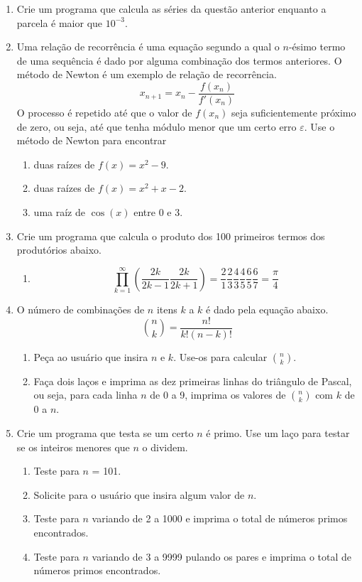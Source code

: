 \begin{enumerate}
  \item Crie um programa que calcula as séries da questão anterior enquanto a parcela é maior que $10^{-3}$.

  \item Uma relação de recorrência é uma equação segundo a qual o $n$-ésimo termo de uma sequência é dado por alguma combinação dos termos anteriores. O método de Newton é um exemplo de relação de recorrência.
    \[ x_{n+1} = x_n - \frac{f(x_n)}{f'(x_n)} \]
    O processo é repetido até que o valor de $f(x_n)$ seja suficientemente próximo de zero, ou seja, até que tenha módulo menor que um certo erro $\varepsilon$. Use o método de Newton para encontrar
    \begin{enumerate}
      \item duas raízes de $f(x) = x^2 - 9$.
      \item duas raízes de $f(x) = x^2 + x - 2$.
      \item uma raíz de $\cos(x)$ entre 0 e 3.
    \end{enumerate}

  \item Crie um programa que calcula o produto dos 100 primeiros termos dos produtórios abaixo.
    \begin{enumerate}
      \item \[ \prod_{k = 1}^{\infty} \left( \frac{2k}{2k - 1}\frac{2k}{2k+1} \right) = \frac 21 \frac 23 \frac 43 \frac 45 \frac 65 \frac 67= \frac \pi4 \]
    \end{enumerate}

  \item O número de combinações de $n$ itens $k$ a $k$ é dado pela equação abaixo.
    \[ {n \choose k} = \frac{n!}{k! (n-k)!} \]
    \begin{enumerate}
      \item Peça ao usuário que insira $n$ e $k$. Use-os para calcular ${n \choose k}$.
      \item Faça dois laços e imprima as dez primeiras linhas do triângulo de Pascal, ou seja, para cada linha $n$ de 0 a 9, imprima os valores de ${n \choose k}$ com $k$ de 0 a $n$.
    \end{enumerate}

  \item Crie um programa que testa se um certo $n$ é primo. Use um laço para testar se os inteiros menores que $n$ o dividem.
    \begin{enumerate}
      \item Teste para $n$ = 101.
      \item Solicite para o usuário que insira algum valor de $n$.
      \item Teste para $n$ variando de 2 a 1000 e imprima o total de números primos encontrados.
      \item Teste para $n$ variando de 3 a 9999 pulando os pares e imprima o total de números primos encontrados.
    \end{enumerate}

\end{enumerate}












